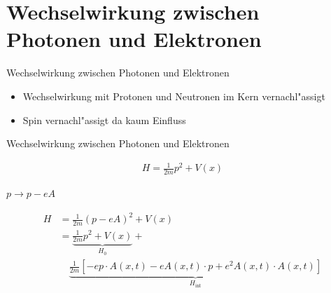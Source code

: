 \documentclass{beamer}
\begin{document}

\section{Wechselwirkung zwischen Photonen und Elektronen}
\begin{frame}[t]{Wechselwirkung zwischen Photonen und Elektronen}
	\vspace*{-0.5cm}
	\begin{center}
		\begin{itemize}
			\item Wechselwirkung mit Protonen und Neutronen im Kern vernachl"assigt
			\item Spin vernachl"assigt da kaum Einfluss
		\end{itemize}
	\end{center}
\end{frame}

\begin{frame}[t]{Wechselwirkung zwischen Photonen und Elektronen}
	\vspace*{-0.5cm}
	\begin{center}
		
		\begin{minipage}{0.35\textwidth}
			\begin{align*}
			H = \frac{1}{2m}p^2 + V(x)
			\end{align*}
		\end{minipage}
		
		\vspace*{0.5cm}
		
		$p \rightarrow p-eA$
		
		\begin{minipage}{0.35\textwidth}
			\begin{align*}
			H &= \frac{1}{2m}(p - eA)^2 + V(x)\\
			&= \underbrace{\frac{1}{2m}p^2 + V(x)}_{H_0} + \\
			 & \quad \underbrace{\frac{1}{2m}\left[- e p \cdot A(x, t) - e A(x, t) \cdot p + e^2 A(x, t) \cdot A(x, t) \right]}_{H_{\text{int}}}
			\end{align*}
		\end{minipage}
	\end{center}
\end{frame}
\end{document}
